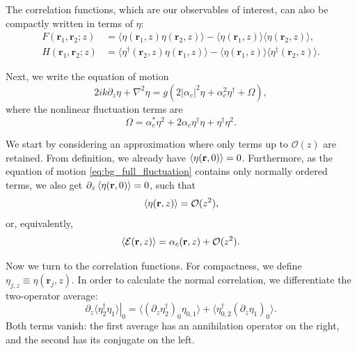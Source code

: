 \documentclass[%
 reprint,
 amsmath,amssymb,
 aps,
pra,
twocolumn,
]{revtex4-2}
\begin{document}
The correlation functions, which are our observables of interest, can also be compactly written in terms of $\eta$:
\begin{equation}
\begin{aligned}
    F(\mathbf r_1,\mathbf r_2;z)&=\langle\eta(\mathbf{r}_1, z)\eta(\mathbf{r}_2, z)\rangle-\langle\eta(\mathbf{r}_1, z)\rangle\langle\eta(\mathbf{r}_2, z)\rangle,\\
    H(\mathbf r_1,\mathbf r_2;z)&=\langle\eta^\dagger(\mathbf{r}_2, z)\eta(\mathbf{r}_1, z)\rangle-\langle\eta(\mathbf{r}_1, z)\rangle\langle\eta^\dagger(\mathbf{r}_2, z)\rangle.
\end{aligned}
\end{equation}

Next, we write the equation of motion
\begin{equation}
    \label{eq:bg_full_fluctuation}
    2ik\partial_z\eta+\nabla^2\eta=g\left(2|\alpha_c|^2\eta+\alpha_c^2\eta^\dagger+\Omega\right),
\end{equation}
where the nonlinear fluctuation terms are
\begin{equation}
    \Omega=\alpha_c^*\eta^2
            +2\alpha_c\eta^\dagger\eta
            +\eta^\dagger\eta^2.
    \label{eq:bg_remainder}
\end{equation}

We start by considering an approximation where only terms up to $\mathcal{O}(z)$ are retained. From definition, we already have $\expval{\eta(\mathbf{r}, 0)} = 0$. Furthermore, as the equation of motion \eqref{eq:bg_full_fluctuation} contains only normally ordered terms, we also get $\partial_z \expval{\eta(\mathbf{r}, 0)} = 0$, such that
\begin{equation}
    \expval{\eta(\mathbf{r}, z)} = \mathcal{O}(z^2),
\end{equation}
or, equivalently,
\begin{equation}
    \expval{\mathcal{E}(\mathbf{r}, z)} = \alpha_c(\mathbf{r}, z) + \mathcal{O}(z^2).
    \label{eq:exp_val_field}
\end{equation}

Now we turn to the correlation functions. For compactness, we define $\eta_{j,z} \equiv \eta(\mathbf{r}_j, z)$. In order to calculate the normal correlation, we differentiate the two-operator average:
\begin{equation}
    \left.\partial_z\langle\eta_2^\dagger\eta_1\rangle\right|_0
       =\langle(\partial_z\eta_2^\dagger)_0\eta_{0,1}\rangle
         +\langle\eta_{0,2}^\dagger(\partial_z\eta_1)_0\rangle.
\end{equation}
Both terms vanish: the first average has an annihilation operator on the right, and the second has its conjugate on the left.
\end{document}
